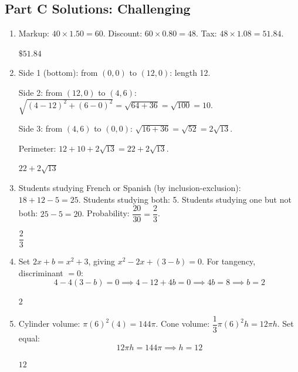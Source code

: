 \documentclass[14pt]{extarticle}
\begin{document}
\subsection*{Part C Solutions: Challenging}
\begin{enumerate}
  \item Markup: \(40 \times 1.50 = 60\). Discount: \(60 \times 0.80 = 48\). Tax: \(48 \times 1.08 = 51.84\).

  \(\boxed{\$51.84}\)

  \item Side 1 (bottom): from \((0,0)\) to \((12,0)\): length 12.

  Side 2: from \((12,0)\) to \((4,6)\): \(\sqrt{(4-12)^2 + (6-0)^2} = \sqrt{64 + 36} = \sqrt{100} = 10\).

  Side 3: from \((4,6)\) to \((0,0)\): \(\sqrt{16 + 36} = \sqrt{52} = 2\sqrt{13}\).

  Perimeter: \(12 + 10 + 2\sqrt{13} = 22 + 2\sqrt{13}\).

  \(\boxed{22 + 2\sqrt{13}}\)

  \item Students studying French or Spanish (by inclusion-exclusion): \(18 + 12 - 5 = 25\). Students studying both: 5. Students studying one but not both: \(25 - 5 = 20\). Probability: \(\dfrac{20}{30} = \dfrac{2}{3}\).

  \(\boxed{\dfrac{2}{3}}\)

  \item Set \(2x + b = x^2 + 3\), giving \(x^2 - 2x + (3 - b) = 0\). For tangency, discriminant \(= 0\):
  \[
  4 - 4(3 - b) = 0 \implies 4 - 12 + 4b = 0 \implies 4b = 8 \implies b = 2
  \]

  \(\boxed{2}\)

  \item Cylinder volume: \(\pi(6)^2(4) = 144\pi\). Cone volume: \(\dfrac{1}{3}\pi(6)^2 h = 12\pi h\). Set equal:
  \[
  12\pi h = 144\pi \implies h = 12
  \]

  \(\boxed{12}\)
\end{enumerate}
\end{document}
